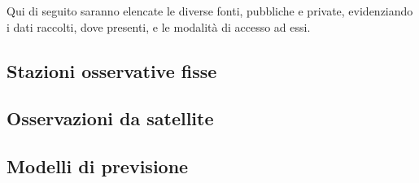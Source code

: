\documentclass[./main.tex]{subfiles}
\begin{document}
Qui di seguito saranno elencate le diverse fonti, pubbliche e private, evidenziando i dati raccolti, dove presenti, e le modalità di accesso ad essi. \par

\subsection{Stazioni osservative fisse}\label{subsec:staz_oss_fisse}


\subsection{Osservazioni da satellite}\label{subsec:oss_satellite}


\subsection{Modelli di previsione}\label{subsec:modelli_previsione}

\end{document}
